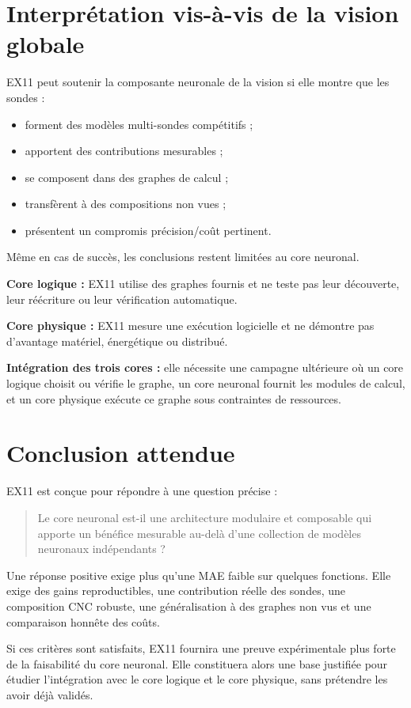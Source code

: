 \documentclass[11pt,a4paper]{article}
\begin{document}
\section{Interprétation vis-à-vis de la vision globale}

EX11 peut soutenir la composante neuronale de la vision si elle montre
que les sondes :
\begin{itemize}
  \item forment des modèles multi-sondes compétitifs ;
  \item apportent des contributions mesurables ;
  \item se composent dans des graphes de calcul ;
  \item transfèrent à des compositions non vues ;
  \item présentent un compromis précision/coût pertinent.
\end{itemize}

Même en cas de succès, les conclusions restent limitées au core neuronal.

\textbf{Core logique :} EX11 utilise des graphes fournis et ne teste pas
leur découverte, leur réécriture ou leur vérification automatique.

\textbf{Core physique :} EX11 mesure une exécution logicielle et ne
démontre pas d'avantage matériel, énergétique ou distribué.

\textbf{Intégration des trois cores :} elle nécessite une campagne
ultérieure où un core logique choisit ou vérifie le graphe, un core
neuronal fournit les modules de calcul, et un core physique exécute
ce graphe sous contraintes de ressources.

\section{Conclusion attendue}

EX11 est conçue pour répondre à une question précise :

\begin{quote}
Le core neuronal est-il une architecture modulaire et composable qui
apporte un bénéfice mesurable au-delà d'une collection de modèles
neuronaux indépendants ?
\end{quote}

Une réponse positive exige plus qu'une MAE faible sur quelques fonctions.
Elle exige des gains reproductibles, une contribution réelle des sondes,
une composition CNC robuste, une généralisation à des graphes non vus
et une comparaison honnête des coûts.

Si ces critères sont satisfaits, EX11 fournira une preuve expérimentale
plus forte de la faisabilité du core neuronal. Elle constituera alors
une base justifiée pour étudier l'intégration avec le core logique et
le core physique, sans prétendre les avoir déjà validés.
\end{document}
